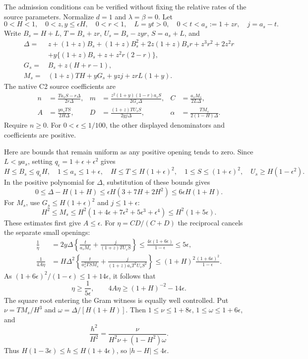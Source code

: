 \documentclass[10pt]{article}
\begin{document}
The admission conditions can be verified without fixing the relative
rates of the source parameters. Normalize $d=1$ and
$\lambda=\beta=0$. Let
\[
 0<H<1,\quad 0<z,y\leq\epsilon H,\quad 0<r<1,\quad
 L=yt>0,\quad 0<t<a_s:=1+zr,\quad j=a_s-t.
\]
Write $B_s=H+L$, $T=B_s+zr$, $U_s=B_s-zyr$, $S=a_s+L$, and
\begin{align*}
 \Delta={}&z+(1+z)B_s+(1+z)B_s^2+2z(1+z)B_sr
       +z^3r^2+2z^2r\\
 &+y\{(1+z)B_s+z+z^2r(2-r)\},\\
 G_s={}&B_s+z(H+r-1),\\
 M_s={}&(1+z)TH+yG_s+yzj+zrL(1+y).
\end{align*}
The native C2 source coefficients are
\begin{align}
 n&=\frac{Ta_sS-r\Delta}{2r\Delta},&
 m&=\frac{z^2(1+y)(1-r)a_sS}{2G_s\Delta},&
 C&=\frac{a_sM_s}{2L\Delta},\nonumber\\
 A&=\frac{ya_sTS}{2H\Delta},&
 D&=\frac{(1+z)TU_sS}{2yj\Delta},&
 \alpha&=\frac{TM_s}{2(1-H)\Delta}.             \label{eq:native}
\end{align}
Require $n\geq0$. For $0<\epsilon\leq1/100$, the other displayed
denominators and coefficients are positive.

Here are bounds that remain uniform as any positive opening tends to
zero. Since $L<ya_s$, setting $q_\epsilon=1+\epsilon+\epsilon^2$ gives
\[
 H\leq B_s\leq q_\epsilon H,\quad
 1\leq a_s\leq1+\epsilon,\quad
 H\leq T\leq H(1+\epsilon)^2,\quad
 1\leq S\leq(1+\epsilon)^2,\quad U_s\geq H(1-\epsilon^2).
\]
In the positive polynomial for $\Delta$, substitution of these bounds
gives
\[
 0\leq\Delta-H(1+H)
 \leq\epsilon H(3+7H+2H^2)
 \leq6\epsilon H(1+H).
\]
For $M_s$, use $G_s\leq H(1+\epsilon)^2$ and $j\leq1+\epsilon$:
\[
 H^2\leq M_s
 \leq H^2(1+4\epsilon+7\epsilon^2+5\epsilon^3+\epsilon^4)
 \leq H^2(1+5\epsilon).
\]
These estimates first give $A\leq\epsilon$.
For $\eta=CD/(C+D)$ the reciprocal cancels the separate small openings:
\begin{align*}
 \frac1\eta
 &=2y\Delta\left\{\frac{t}{a_sM_s}
             +\frac{j}{(1+z)TU_sS}\right\}
 \leq\frac{4\epsilon(1+6\epsilon)}{1-\epsilon}
 \leq5\epsilon,\\
 \frac1{4A\eta}
 &=H\Delta^2\left\{\frac{t}{a_s^2TSM_s}
             +\frac{j}{(1+z)a_sT^2U_sS^2}\right\}
 \leq(1+H)^2\frac{(1+6\epsilon)^2}{1-\epsilon}.
\end{align*}
As $(1+6\epsilon)^2/(1-\epsilon)\leq1+14\epsilon$, it follows that
\[
 \eta\geq\frac1{5\epsilon},\qquad
 4A\eta\geq(1+H)^{-2}-14\epsilon.
\]
The square root entering the Gram witness is equally well controlled.
Put $\nu=TM_s/H^3$ and $\omega=\Delta/[H(1+H)]$.
Then $1\leq\nu\leq1+8\epsilon$, $1\leq\omega\leq1+6\epsilon$, and
\[
 \frac{h^2}{H^2}=
 \frac{\nu}{H^2\nu+(1-H^2)\omega}.
\]
Thus $H(1-3\epsilon)\leq h\leq H(1+4\epsilon)$, so
$|h-H|\leq4\epsilon$.
\end{document}
